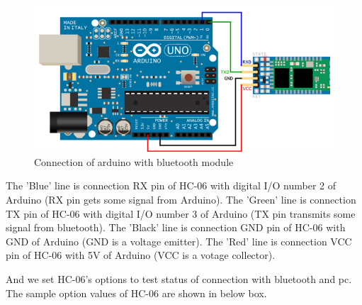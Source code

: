 \documentclass[conference]{IEEEtran}
\begin{document}
\begin{figure}[h]
\begin{center}
    \includegraphics[scale=0.45]{img_02}
    \caption{Connection of arduino with bluetooth module} 
\end{center}
\end{figure}

The 'Blue' line is connection RX pin of HC-06 with digital I/O number 2 of Arduino (RX pin gets some signal from Arduino). The 'Green' line is connection TX pin of HC-06 with digital I/O number 3 of Arduino (TX pin transmits some signal from bluetooth). The 'Black' line is connection GND pin of HC-06 with GND of Arduino (GND is a voltage emitter). The 'Red' line is connection VCC pin of HC-06 with 5V of Arduino (VCC is a votage collector). 

And we set HC-06's options to test status of connection with bluetooth and pc. The sample option values of HC-06 are shown in below box.\\

\end{document}
